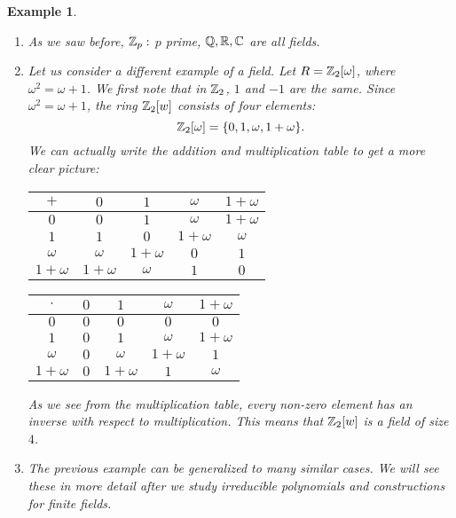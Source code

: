 \documentclass[12pt]{article}
\theoremstyle{plain}
\newtheorem{example}{Example}
\theoremstyle{definition}
\theoremstyle{remark}
\begin{document}
\begin{example}
\begin{enumerate}
    \item As we saw before, $\mathbb{Z}_p:$ $p$ prime, $\mathbb{Q}, \mathbb{R}, \mathbb{C}$ are all fields. 
    \item Let us consider a different example of a field. Let $R = \mathbb{Z}_2[\omega]$, where $\omega^2=\omega+1$. We first note that in $\mathbb{Z}_2$, $1$ and $-1$ are the same. Since $\omega^2=\omega+1$, the ring $\mathbb{Z}_2[w]$ consists of four elements:
    $$\mathbb{Z}_2[\omega] = \{0, 1, \omega, 1+\omega\}.$$
    We can actually write the addition and multiplication table to get a more clear picture:
    
    
\begin{table}[H]
\qquad \quad 
\begin{tabular}{ c| c | c |c|c}
$+$  & $0$ & $1$ & $\omega$ & $1+\omega$ \\
\hline
$0$ & $0$ & $1$ & $\omega$ & $1+\omega$  \\ 
\hline
$1$ & $1$ & $0$ & $1+\omega$ & $\omega$  \\ 
\hline
$\omega$ & $\omega$ & $1+\omega$ & $0$ & $1$ \\ 
\hline
$1+\omega$ & $1+\omega$& $\omega$ & $1$&$0$\\

\end{tabular}
\quad \quad \quad \quad \quad \quad \quad
\begin{tabular}{ c| c | c |c|c}
$\cdot$  & $0$ & $1$ & $\omega$ & $1+\omega$ \\
\hline
$0$ & $0$ & $0$ & $0$ & $0$  \\ 
\hline
$1$ & $0$ & $1$ & $\omega$ & $1+\omega$  \\ 
\hline
$\omega$ & $0$ & $\omega$ & $1+\omega$ & $1$ \\ 
\hline
$1+\omega$ & $0$& $1+\omega$ & $1$&$\omega$\\

\end{tabular}
\end{table}
As we see from the multiplication table, every non-zero element has an inverse with respect to multiplication. This means that $\mathbb{Z}_2[w]$ is a field of size $4$. 
\item The previous example can be generalized to many similar cases. We will see these in more detail after we study irreducible polynomials and constructions for finite fields. 
\end{enumerate}
\end{example}
\end{document}
